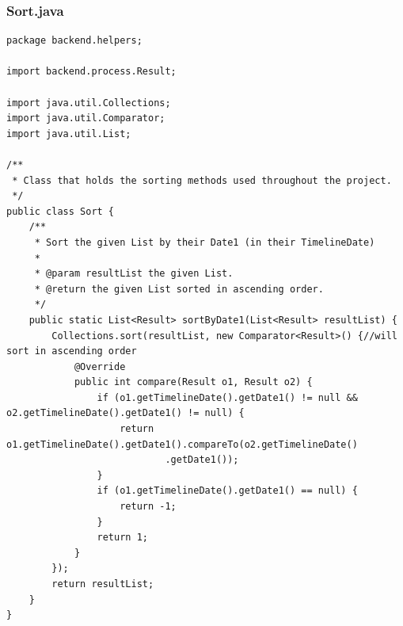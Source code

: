 \subsubsection{Sort.java}
\begin{lstlisting}
package backend.helpers;

import backend.process.Result;

import java.util.Collections;
import java.util.Comparator;
import java.util.List;

/**
 * Class that holds the sorting methods used throughout the project.
 */
public class Sort {
    /**
     * Sort the given List by their Date1 (in their TimelineDate)
     *
     * @param resultList the given List.
     * @return the given List sorted in ascending order.
     */
    public static List<Result> sortByDate1(List<Result> resultList) {
        Collections.sort(resultList, new Comparator<Result>() {//will sort in ascending order
            @Override
            public int compare(Result o1, Result o2) {
                if (o1.getTimelineDate().getDate1() != null && o2.getTimelineDate().getDate1() != null) {
                    return o1.getTimelineDate().getDate1().compareTo(o2.getTimelineDate()
                    		.getDate1());
                }
                if (o1.getTimelineDate().getDate1() == null) {
                    return -1;
                }
                return 1;
            }
        });
        return resultList;
    }
}
\end{lstlisting}
